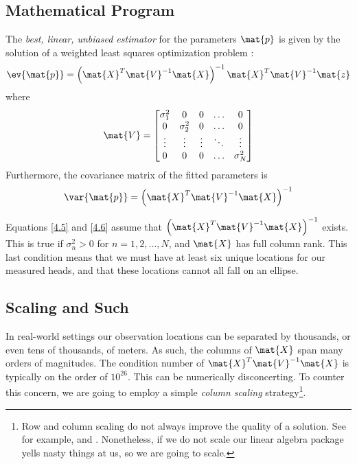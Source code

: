 \documentclass[12pt]{article}
\begin{document}
\subsection{Mathematical Program}
The {\em best, linear, unbiased estimator} for the parameters $\mat{p}$ is given by the solution of a weighted least squares optimization problem \citep[e.g.][~Chapter 3]{Ryan97}:
%
\begin{equation}\label{4.5}
    \ev{\mat{p}} = \left( \mat{X}^T \mat{V}^{-1} \mat{X} \right)^{-1} \mat{X}^T \mat{V}^{-1} \mat{z}
\end{equation}
%
where
%
\begin{equation}\label{4.6}
    \mat{V} =
    \begin{bmatrix}
        \sigma_1^2 & 0 & 0 & \ldots & 0 \\
        0 & \sigma_2^2 & 0 & \ldots & 0 \\
        \vdots & \vdots & \vdots & \ddots & \vdots \\
        0 & 0 & 0 & \ldots & \sigma_N^2
    \end{bmatrix}
\end{equation}
%
Furthermore, the covariance matrix of the fitted parameters is
%
\begin{equation}\label{4.7}
    \var{ \mat{p} } = \left( \mat{X}^T \mat{V}^{-1} \mat{X} \right)^{-1}
\end{equation}

Equations \eqref{4.5} and \eqref{4.6} assume that $\left( \mat{X}^T \mat{V}^{-1} \mat{X} \right)^{-1}$ exists. This is true if $\sigma_n^2 > 0$ for $n= 1, 2, \ldots, N$, and $\mat{X}$ has full column rank. This last condition means that we must have at least six unique locations for our measured heads, and that these locations cannot all fall on an ellipse.

\subsection{Scaling and Such}
In real-world settings our observation locations can be separated by thousands, or even tens of thousands, of meters. As such, the columns of $\mat{X}$ span many orders of magnitudes. The condition number of $\mat{X}^T \mat{V}^{-1} \mat{X}$ is typically on the order of $10^{26}$. This can be numerically disconcerting. To counter this concern, we are going to employ a simple {\em column scaling} strategy\footnote{Row and column scaling do not always improve the quality of a solution. See for example, \citet[Section 3.5.2]{Golub96} and \citet[Section 9.7]{Higham96}. Nonetheless, if we do not scale our linear algebra package yells nasty things at us, so we are going to scale.}.
\end{document}
